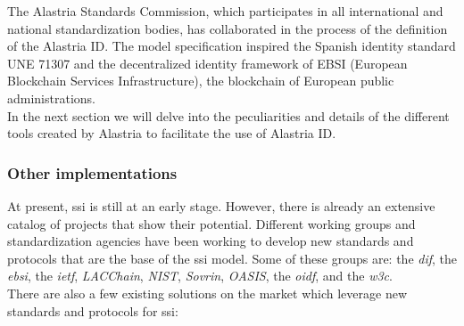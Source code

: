                     The Alastria Standards Commission, which participates in all international and national standardization bodies, has collaborated in the process of the definition of the Alastria ID. The model specification inspired the Spanish identity standard UNE 71307\cite{une-71307} and the decentralized identity framework of EBSI\cite{ebsi} (European Blockchain Services Infrastructure), the blockchain of European public administrations.\\
                    
                    In the next section we will delve into the peculiarities and details of the different tools created by Alastria to facilitate the use of Alastria ID.

            \subsubsection{Other implementations}
                At present, \acrlong{ssi} is still at an early stage. However, there is already an extensive catalog of projects that show their potential. Different working groups and standardization agencies have been working to develop new standards and protocols that are the base of the \acrshort{ssi} model\cite{ssi-wallets}. Some of these groups are: the \textit{\acrfull{dif}}, the \textit{\acrfull{ebsi}}, the \textit{\acrfull{ietf}}, \textit{LACChain}, \textit{NIST}, \textit{Sovrin}, \textit{OASIS}, the \textit{\acrfull{oidf}}, and the \textit{\acrfull{w3c}}.\\
                
                There are also a few existing solutions on the market which leverage new standards and protocols for \acrshort{ssi}:
